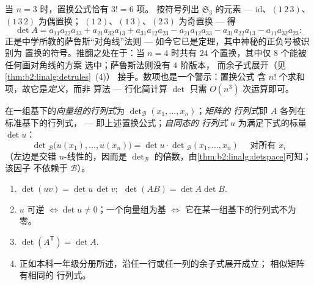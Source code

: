 \begin{example}[萨鲁斯法则的推导与推翻]\label{ex:b2:linalg:sarrus}
当 $n = 3$ 时，置换公式恰有 $3! = 6$ 项。
按符号列出 $\mathfrak{S}_3$ 的元素 ---
$\mathrm{id}$、$(1\,2\,3)$、$(1\,3\,2)$ 为偶置换；
$(1\,2)$、$(1\,3)$、$(2\,3)$ 为奇置换 --- 得
\[
\det A = a_{11}a_{22}a_{33} + a_{21}a_{32}a_{13} +
a_{31}a_{12}a_{23}
- a_{21}a_{12}a_{33} - a_{31}a_{22}a_{13} -
a_{11}a_{32}a_{23} :
\]
正是中学所教的萨鲁斯“对角线”法则 ---
如今它已是定理，其中神秘的正负号被识别为
置换的符号。推翻之处在于：当 $n = 4$ 时共有 $24$
个置换，其中仅 $8$ 个能被任何画对角线的方案
选中；萨鲁斯法则没有 $4$ 阶版本，
而余子式展开（见\cref{thm:b2:linalg:detrules}~(4)）
接手。数项也是一个警示：置换公式
含 $n!$ 个求和项，故它是\emph{定义}，而非
算法 --- 行化简计算 $\det$ 只需
$O(n^3)$ 次运算即可。
\end{example}

\begin{definition}[行列式]\label{def:b2:linalg:det}
在一组基下的\emph{向量组的行列式}为
$\det_{\mathcal{B}}(x_1, \dots, x_n)$；\emph{矩阵的
行列式}即 $A$ 各列在标准基下的行列式，
--- 即上述置换公式；\emph{自同态的
行列式} $u$ 为满足下式的标量 $\det u$：
\[
\det{}_{\mathcal{B}}\bigl(u(x_1), \dots, u(x_n)\bigr)
= \det u \cdot \det{}_{\mathcal{B}}(x_1, \dots, x_n)
\quad \text{ 对所有 } x_i
\]
（左边是交错 $n$-线性的，因而是
$\det_\mathcal{B}$ 的倍数，由\cref{thm:b2:linalg:detspace}可知；该因子
不依赖于 $\mathcal{B}$）。
\end{definition}

\begin{theorem}[行列式的运算法则（已证）]\label{thm:b2:linalg:detrules}
\begin{enumerate}
  \item $\det(uv) = \det u\,\det v$; $\;\det(AB) = \det A \det B$.
  \item $u$ 可逆 $\iff \det u \neq 0$；一个向量组为基
        $\iff$ 它在某一组基下的行列式不为零。
  \item $\det(A^{\mathsf T}) = \det A$.
  \item 正如本科一年级分册所述，沿任一行或任一列的余子式展开成立；
        相似矩阵有相同的
        行列式。
\end{enumerate}
\end{theorem}

